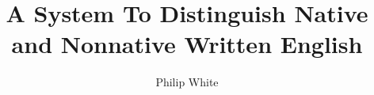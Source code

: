 \documentclass[12pt]{article}
\title{A System To Distinguish Native and Nonnative Written English}
\author{Philip White}
\numberwithin{figure}{section}
\numberwithin{table}{section}
\numberwithin{enums}{section}
\def\biblio{}
\begin{document}
\def\biblio{} %


\maketitle

%












\end{document}
